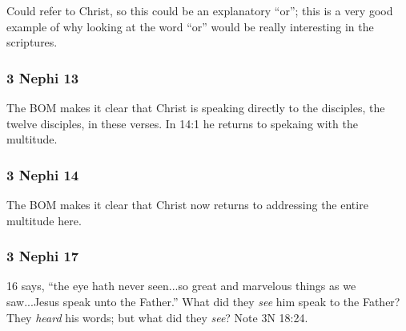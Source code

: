 \begin{compactdesc}
		\item[48$\vert$]
		\begin{compactdesc}
		\item[Father who is in heaven] Could refer to Christ, so this could be an explanatory ``or''; this is a very good example of why looking at the word ``or'' would be really interesting in the scriptures.
		\end{compactdesc}
		
		\end{compactdesc}
		
	\subsubsection{3 Nephi 13} %
	
		\begin{compactdesc}
		
		\item[25--34$\vert$]
		\begin{compactdesc}
		\item[Who receives these remarks?] The BOM makes it clear that Christ is speaking directly to the disciples, the twelve disciples, in these verses. In 14:1 he returns to spekaing with the multitude.
		\end{compactdesc}
		
		\end{compactdesc}
		
	\subsubsection{3 Nephi 14} %
	
		\begin{compactdesc}
		
		\item[1$\vert$]
		\begin{compactdesc}
		\item[Who receives these remarks?] The BOM makes it clear that Christ now returns to addressing the entire multitude here.
		\end{compactdesc}
		
		\end{compactdesc}
		
	\subsubsection{3 Nephi 17} %
	
		\begin{compactdesc}
		
		\item[16--17$\vert$]
		\begin{compactdesc}
		\item[saw Jesus speak] 16 says, ``the eye hath never seen...so great and marvelous things as we saw...Jesus speak unto the Father.'' What did they \textit{see} him speak to the Father? They \textit{heard} his words; but what did they \textit{see}? Note 3N 18:24.
		\end{compactdesc}
		
		\end{compactdesc}
		
